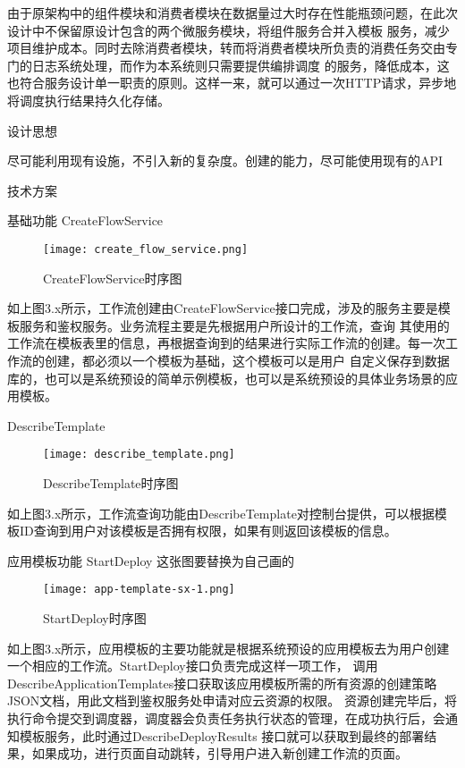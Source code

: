 由于原架构中的组件模块和消费者模块在数据量过大时存在性能瓶颈问题，在此次设计中不保留原设计包含的两个微服务模块，将组件服务合并入模板
服务，减少项目维护成本。同时去除消费者模块，转而将消费者模块所负责的消费任务交由专门的日志系统处理，而作为本系统则只需要提供编排调度
的服务，降低成本，这也符合服务设计单一职责的原则。这样一来，就可以通过一次HTTP请求，异步地将调度执行结果持久化存储。

设计思想

尽可能利用现有设施，不引入新的复杂度。创建的能力，尽可能使用现有的API

技术方案

基础功能
CreateFlowService

\begin{figure}[H]
    \centering
    \texttt{[image: create\_flow\_service.png]}
    \caption{CreateFlowService时序图}
    \label{fig:CreateFlowService时序图}
    \note{}
\end{figure}

如上图3.x所示，工作流创建由CreateFlowService接口完成，涉及的服务主要是模板服务和鉴权服务。业务流程主要是先根据用户所设计的工作流，查询
其使用的工作流在模板表里的信息，再根据查询到的结果进行实际工作流的创建。每一次工作流的创建，都必须以一个模板为基础，这个模板可以是用户
自定义保存到数据库的，也可以是系统预设的简单示例模板，也可以是系统预设的具体业务场景的应用模板。

DescribeTemplate

\begin{figure}[H]
    \centering
    \texttt{[image: describe\_template.png]}
    \caption{DescribeTemplate时序图}
    \label{fig:DescribeTemplate时序图}
    \note{}
\end{figure}

如上图3.x所示，工作流查询功能由DescribeTemplate对控制台提供，可以根据模板ID查询到用户对该模板是否拥有权限，如果有则返回该模板的信息。



应用模板功能
StartDeploy
这张图要替换为自己画的
\begin{figure}[h]
    \centering
    \texttt{[image: app-template-sx-1.png]}
    \caption{StartDeploy时序图}
    \label{fig:StartDeploy时序图}
\end{figure}
如上图3.x所示，应用模板的主要功能就是根据系统预设的应用模板去为用户创建一个相应的工作流。StartDeploy接口负责完成这样一项工作，
调用DescribeApplicationTemplates接口获取该应用模板所需的所有资源的创建策略JSON文档，用此文档到鉴权服务处申请对应云资源的权限。
资源创建完毕后，将执行命令提交到调度器，调度器会负责任务执行状态的管理，在成功执行后，会通知模板服务，此时通过DescribeDeployResults
接口就可以获取到最终的部署结果，如果成功，进行页面自动跳转，引导用户进入新创建工作流的页面。

